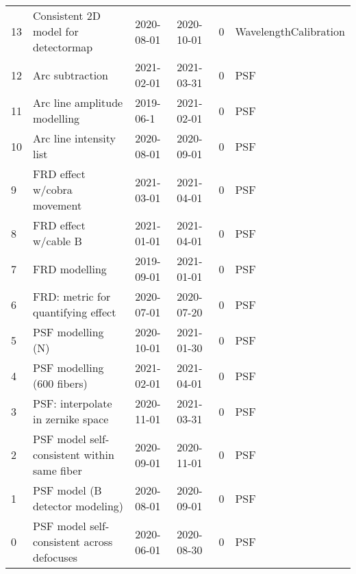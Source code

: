 \begin{tabular}{llllrl}
13 &          Consistent 2D model for detectormap &  2020-08-01 &  2020-10-01 &         0 &  WavelengthCalibration \\
12 &                              Arc subtraction &  2021-02-01 &  2021-03-31 &         0 &                    PSF \\
11 &                 Arc line amplitude modelling &   2019-06-1 &  2021-02-01 &         0 &                    PSF \\
10 &                      Arc line intensity list &  2020-08-01 &  2020-09-01 &         0 &                    PSF \\
9  &                  FRD effect w/cobra movement &  2021-03-01 &  2021-04-01 &         0 &                    PSF \\
8  &                         FRD effect w/cable B &  2021-01-01 &  2021-04-01 &         0 &                    PSF \\
7  &                                FRD modelling &  2019-09-01 &  2021-01-01 &         0 &                    PSF \\
6  &           FRD: metric for quantifying effect &  2020-07-01 &  2020-07-20 &         0 &                    PSF \\
5  &                            PSF modelling (N) &  2020-10-01 &  2021-01-30 &         0 &                    PSF \\
4  &                   PSF modelling (600 fibers) &  2021-02-01 &  2021-04-01 &         0 &                    PSF \\
3  &            PSF: interpolate in zernike space &  2020-11-01 &  2021-03-31 &         0 &                    PSF \\
2  &  PSF model self-consistent within same fiber &  2020-09-01 &  2020-11-01 &         0 &                    PSF \\
1  &              PSF model (B detector modeling) &  2020-08-01 &  2020-09-01 &         0 &                    PSF \\
0  &   PSF model self-consistent across defocuses &  2020-06-01 &  2020-08-30 &         0 &                    PSF \\
\bottomrule
\end{tabular}
